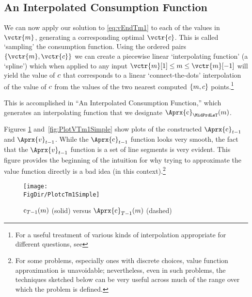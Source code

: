 \hypertarget{an-interpolated-consumption-function}{}
\subsection{An Interpolated Consumption Function} \label{subsec:LinInterp}

We can now apply our solution to \eqref{eq:vEndTm1} to each of the values in $\vctr{m}$, generating a corresponding optimal $\vctr{c}$.  This is called `sampling' the consumption function.  Using the ordered pairs $\{\vctr{m},\vctr{c}\}$ we can create a piecewise linear `interpolating function' (a `spline') which when applied to any input $\vctr{m}[1] \leq {m} \leq \vctr{m}[-1]$ will yield the value of $c$ that corresponds to a linear `connect-the-dots' interpolation of the value of $c$ from the values of the two nearest computed $\{m,c\}$ points.\footnote{For a useful treatment of various kinds of interpolation appropriate for different questions, see } %

This is accomplished in ``An Interpolated Consumption Function,'' which generates an interpolating function that we designate $\Aprx{\cFunc}_{\MidPrdLsT}(\mNrm)$. %

Figures \ref{fig:PlotcTm1Simple} and~\ref{fig:PlotVTm1Simple} show
plots of the constructed $\Aprx{\cFunc}_{\prdT-1}$ and $\Aprx{\vFunc}_{\prdT-1}$. While the $\Aprx{\cFunc}_{\prdT-1}$ function looks very smooth, the fact that the $\Aprx{\vFunc}_{\prdT-1}$ function is a set of line segments is very evident.  This figure provides the beginning of the intuition for why trying to approximate the value function directly is a bad idea (in this context).\footnote{For some problems, especially ones with discrete choices, value function approximation is unavoidable; nevertheless, even in such problems, the techniques sketched below can be very useful across much of the range over which the problem is defined.}

\hypertarget{PlotcTm1Simple}{}
\begin{figure}
  \centerline{\texttt{[image: \\FigDir/PlotcTm1Simple]}}
  \caption{$\mathrm{c}_{T-1}(m)$ (solid) versus $\Aprx{\cFunc}_{\trmT-1}(\mNrm)$ (dashed)}
  \label{fig:PlotcTm1Simple}
\end{figure}

